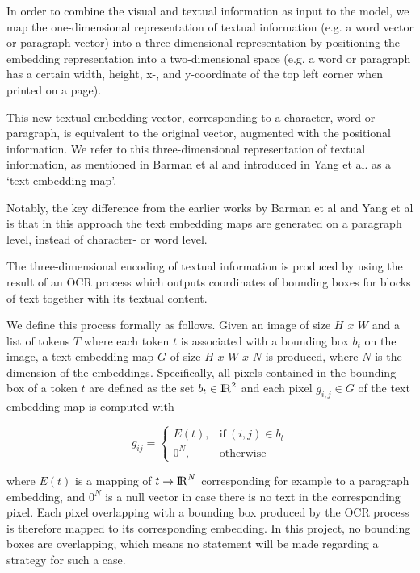 \documentclass[english, bibtex]{kththesis}
\begin{document}
In order to combine the visual and textual information as input to the model, we map the one-dimensional representation of textual information (e.g. a word vector or paragraph vector) into a three-dimensional representation by positioning the embedding representation into a two-dimensional space (e.g. a word or paragraph has a certain width, height, x-, and y-coordinate of the top left corner when printed on a page). 

This new textual embedding vector, corresponding to a character, word or paragraph, is equivalent to the original vector, augmented with the positional information. We refer to this three-dimensional representation of textual information, as mentioned in Barman et al\cite{jdmdh:7097} and introduced in Yang et al.\cite{DBLP:journals/corr/YangYAKKG17} as a ‘text embedding map’.

Notably, the key difference from the earlier works by Barman et al\cite{jdmdh:7097} and Yang et al\cite{DBLP:journals/corr/YangYAKKG17} is that in this approach the text embedding maps are generated on a paragraph level, instead of character- or word level.

The three-dimensional encoding of textual information is produced by using the result of an OCR process which outputs coordinates of bounding boxes for blocks of text together with its textual content.

We define this process formally as follows. Given an image of size $H$ $x$ $W$ and a list of tokens $T$ where each token $t$ is associated with a bounding box $b_t$ on the image, a text embedding map $G$ of size $H$ $x$ $W$ $x$ $N$ is produced, where $N$ is the dimension of the embeddings. Specifically, all pixels contained in the bounding box of a token $t$ are defined as the set $b_t \in {\rm I\!R}^2$ and each pixel $g_{i,j} \in G$ of the text embedding map is computed with 

\begin{equation}
	g_{ij} = 
	    \begin{cases}
	      E(t), & \text{if}\ (i,j) \in b_t \\
	      0^N, & \text{otherwise}
	    \end{cases}
  	\label{eqn:textembedding}
\end{equation}

where $E(t)$ is a mapping of $t \rightarrow {\rm I\!R}^N$ corresponding for example to a paragraph embedding, and $0^N$ is a null vector in case there is no text in the corresponding pixel. Each pixel overlapping with a bounding box produced by the OCR process is therefore mapped to its corresponding embedding. In this project, no bounding boxes are overlapping, which means no statement will be made regarding a strategy for such a case.
\end{document}
